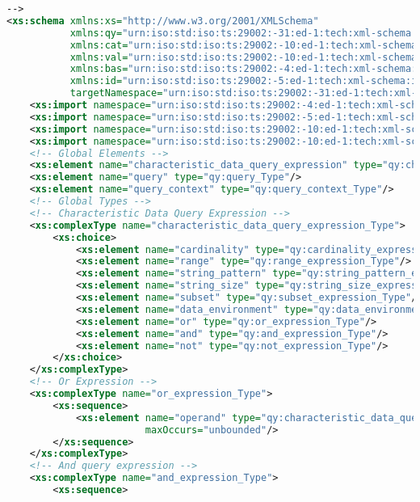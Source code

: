 \begin{lstlisting}[caption=query.xsd, language=XML, label=lst:query_xsd]
-->
<xs:schema xmlns:xs="http://www.w3.org/2001/XMLSchema"
           xmlns:qy="urn:iso:std:iso:ts:29002:-31:ed-1:tech:xml-schema:query"
           xmlns:cat="urn:iso:std:iso:ts:29002:-10:ed-1:tech:xml-schema:catalogue"
           xmlns:val="urn:iso:std:iso:ts:29002:-10:ed-1:tech:xml-schema:value"
           xmlns:bas="urn:iso:std:iso:ts:29002:-4:ed-1:tech:xml-schema:basic"
           xmlns:id="urn:iso:std:iso:ts:29002:-5:ed-1:tech:xml-schema:identifier"
           targetNamespace="urn:iso:std:iso:ts:29002:-31:ed-1:tech:xml-schema:query" elementFormDefault="qualified">
    <xs:import namespace="urn:iso:std:iso:ts:29002:-4:ed-1:tech:xml-schema:basic" schemaLocation="basic.xsd"/>
    <xs:import namespace="urn:iso:std:iso:ts:29002:-5:ed-1:tech:xml-schema:identifier" schemaLocation="identifier.xsd"/>
    <xs:import namespace="urn:iso:std:iso:ts:29002:-10:ed-1:tech:xml-schema:catalogue" schemaLocation="catalogue.xsd"/>
    <xs:import namespace="urn:iso:std:iso:ts:29002:-10:ed-1:tech:xml-schema:value" schemaLocation="value.xsd"/>
    <!-- Global Elements -->
    <xs:element name="characteristic_data_query_expression" type="qy:characteristic_data_query_expression_Type"/>
    <xs:element name="query" type="qy:query_Type"/>
    <xs:element name="query_context" type="qy:query_context_Type"/>
    <!-- Global Types -->
    <!-- Characteristic Data Query Expression -->
    <xs:complexType name="characteristic_data_query_expression_Type">
        <xs:choice>
            <xs:element name="cardinality" type="qy:cardinality_expression_Type"/>
            <xs:element name="range" type="qy:range_expression_Type"/>
            <xs:element name="string_pattern" type="qy:string_pattern_expression_Type"/>
            <xs:element name="string_size" type="qy:string_size_expression_Type"/>
            <xs:element name="subset" type="qy:subset_expression_Type"/>
            <xs:element name="data_environment" type="qy:data_environment_expression_Type"/>
            <xs:element name="or" type="qy:or_expression_Type"/>
            <xs:element name="and" type="qy:and_expression_Type"/>
            <xs:element name="not" type="qy:not_expression_Type"/>
        </xs:choice>
    </xs:complexType>
    <!-- Or Expression -->
    <xs:complexType name="or_expression_Type">
        <xs:sequence>
            <xs:element name="operand" type="qy:characteristic_data_query_expression_Type" minOccurs="2"
                        maxOccurs="unbounded"/>
        </xs:sequence>
    </xs:complexType>
    <!-- And query expression -->
    <xs:complexType name="and_expression_Type">
        <xs:sequence>

\end{lstlisting}
